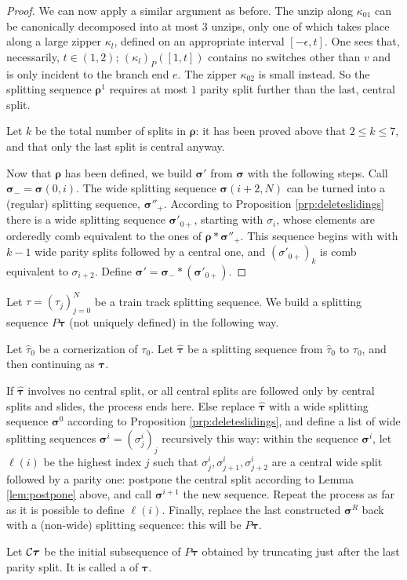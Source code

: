 \begin{proof}
We can now apply a similar argument as before. The unzip along $\kappa_{01}$ can be canonically decomposed into at most $3$ unzips, only one of which takes place along a large zipper $\kappa_l$, defined on an appropriate interval $[-\epsilon,t]$. One sees that, necessarily, $t\in(1,2)$; $(\kappa_l)_P([1,t])$ contains no switches other than $v$ and is only incident to the branch end $e$. The zipper $\kappa_{02}$ is small instead. So the splitting sequence $\bm\rho^1$ requires at most $1$ parity split further than the last, central split.

Let $k$ be the total number of splits in $\bm\rho$: it has been proved above that $2\leq k\leq 7$, and that only the last split is central anyway.

Now that $\bm\rho$ has been defined, we build $\bm\sigma'$ from $\bm\sigma$ with the following steps. Call $\bm\sigma_-=\bm\sigma(0,i)$. The wide splitting sequence $\bm\sigma(i+2,N)$ can be turned into a (regular) splitting sequence, $\bm\sigma''_+$. According to Proposition \ref{prp:deleteslidings} there is a wide splitting sequence $\bm\sigma'_{0+}$, starting with $\sigma_i$, whose elements are orderedly comb equivalent to the ones of $\bm\rho*\bm\sigma''_+$. This sequence begins with with $k-1$ wide parity splits followed by a central one, and $(\sigma'_{0+})_k$ is comb equivalent to $\sigma_{i+2}$. Define $\bm\sigma'=\bm\sigma_-*(\bm\sigma'_{0+})$. 
\end{proof}

\begin{defin}\label{def:cornerizedseq}
Let $\tau=(\tau_j)_{j=0}^N$ be a train track splitting sequence. We build a splitting sequence $P\bm\tau$ (not uniquely defined) in the following way.

Let $\hat\tau_0$ be a cornerization of $\tau_0$. Let $\bm{\hat\tau}$ be a splitting sequence from $\hat\tau_0$ to $\tau_0$, and then continuing as $\bm\tau$.

If $\bm{\hat\tau}$ involves no central split, or all central splits are followed only by central splits and slides, the process ends here. Else replace $\bm{\hat\tau}$ with a wide splitting sequence $\bm\sigma^0$ according to Proposition \ref{prp:deleteslidings}, and define a list of wide splitting sequences $\bm\sigma^i=(\sigma^i_j)_j$ recursively this way: within the sequence $\bm\sigma^i$, let $\ell(i)$ be the highest index $j$ such that $\sigma^i_j,\sigma^i_{j+1},\sigma^i_{j+2}$ are a central wide split followed by a parity one: postpone the central split according to Lemma \ref{lem:postpone} above, and call $\bm\sigma^{i+1}$ the new sequence. Repeat the process as far as it is possible to define $\ell(i)$. Finally, replace the last constructed $\bm\sigma^R$ back with a (non-wide) splitting sequence: this will be $P\bm\tau$.

Let ${\mathcal C}\bm\tau$ be the initial subsequence of $P\bm\tau$ obtained by truncating just after the last parity split. It is called a  of $\bm\tau$.
\end{defin}

